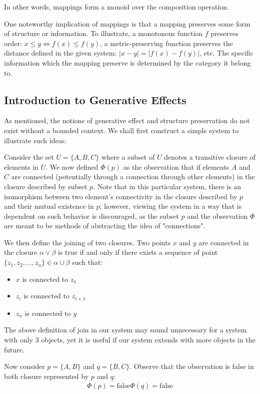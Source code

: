 \documentclass[12pt]{article}
\theoremstyle{definition}
\newcommand{\mo}[1]{\lvert #1 \rvert}
\begin{document}
	In other words, mappings form a monoid over the composition operation.
	
	One noteworthy implication of mappings is that a mapping preserves some form of structure or information. To illustrate, a monotonous function $f$ preserves order: $x \leq y \iff f(x) \leq f(y)$, a metric-preserving function preserves the distance defined in the given system: $\mo{x - y} = \mo{f(x) - f(y)}$, etc. The specific information which the mapping preserve is determined by the category it belong to.
	
	\subsection{Introduction to Generative Effects}
	
	As mentioned, the notions of generative effect and structure preservation do not exist without a bounded context. We shall first construct a simple system to illustrate such ideas.
	
	Consider the set $U = \{A, B, C\}$ where a subset of $U$ denotes a transitive closure of elements in $U$. We now defined $\Phi(p)$ as the observation that if elements $A$ and $C$ are connected (potentially through a connection through other elements) in the closure described by subset $p$. Note that in this particular system, there is an isomorphism between two element's connectivity in the closure described by $p$ and their mutual existence in $p$; however, viewing the system in a way that is dependent on such behavior is discouraged, as the subset $p$ and the observation $\Phi$ are  meant to be methods of abstracting the idea of "connections".
	
	We then define the joining of two closures. Two points $x$ and $y$ are connected in the closure $\alpha \lor \beta$ is true if and only if there exists a sequence of point $\{z_1, z_2, \dots, z_n\} \in \alpha \cup \beta$ such that:
	\begin{itemize}
		\item $x$ is connected to $z_1$
		\item $z_i$ is connected to $z_{i + 1}$
		\item $z_n$ is connected to $y$
	\end{itemize}
	
	The above definition of join in our system may sound unnecessary for a system with only $3$ objects, yet it is useful if our system extends with more objects in the future.
	
	Now consider $p = \{A, B\}$ and $q = \{B, C\}$. Observe that the observation is false in both closure represented by $p$ and $q$:
	\begin{align*}
		\Phi(p) = \text{false}
		\Phi(q) = \text{false}
	\end{align*}
	
\end{document}
